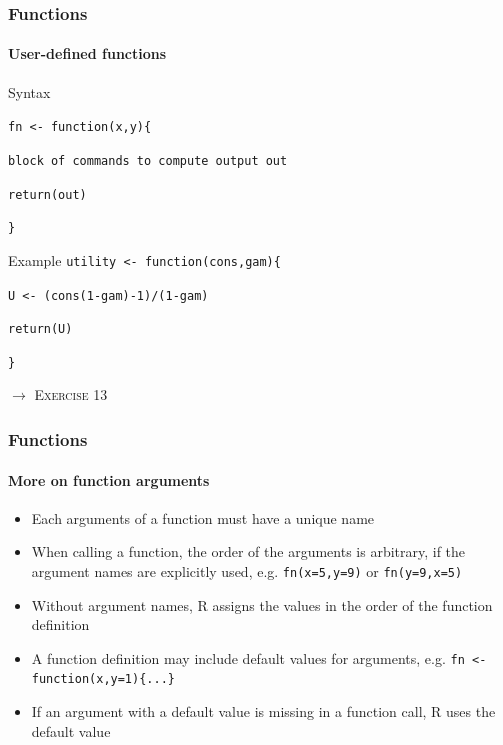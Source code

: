 \documentclass[title={Introduction to R}, author={Mutschler and Zaharieva}, inst={Institute for Econometrics and Empirical Economics}]{beamer}
\begin{document}
\begin{frame}
\frametitle{Functions}
\framesubtitle{User-defined functions}
Syntax\medskip

\texttt{fn <- function(x,y)\{}

\quad \texttt{block of commands to compute output out}

\quad \texttt{return(out)}

\quad \texttt{\}\bigskip}
\begin{block}{Example}
\texttt{utility <- function(cons,gam)\{}

\quad \texttt{U <- (cons(1-gam)-1)/(1-gam)}

\quad \texttt{return(U)}

\quad \texttt{\}}
\end{block}\pause
$\longrightarrow $ \textsc{Exercise 13}
\end{frame}


\begin{frame}
\frametitle{Functions}
\framesubtitle{More on function arguments}
\begin{itemize}
\item Each arguments of a function must have a unique name
\item When calling a function, the order of the arguments is \newline
arbitrary, if the argument names are explicitly used, \newline
e.g. \texttt{fn(x=5,y=9)} or \texttt{fn(y=9,x=5)}
\item Without argument names, R assigns the values in the order of the
function definition
\item A function definition may include default values for arguments, 
\newline
e.g. \texttt{fn <- function(x,y=1)\{...\}}
\item If an argument with a default value is missing in a function call, R
uses the default value
\end{itemize}
\end{frame}
\end{document}
